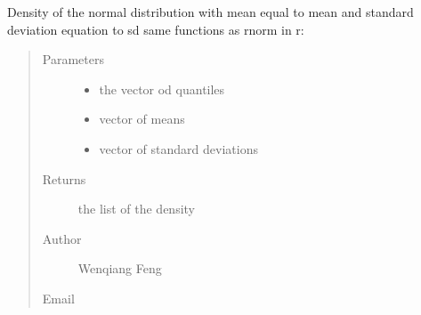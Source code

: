 \documentclass[letterpaper,12pt,english]{sphinxmanual}
\begin{document}
\begin{fulllineitems}
Density of the normal distribution with mean
equal to mean and standard deviation equation to sd
same functions as rnorm in r: 
\begin{quote}\begin{description}
\item[{Parameters}] \leavevmode\begin{itemize}
\item {} 
 \textendash{} the vector od quantiles

\item {} 
 \textendash{} vector of means

\item {} 
 \textendash{} vector of standard deviations

\end{itemize}

\item[{Returns}] \leavevmode
the list of the density

\item[{Author}] \leavevmode
Wenqiang Feng

\item[{Email}] \leavevmode
{}

\end{description}\end{quote}

\end{fulllineitems}



\section{}
\label{\detokenize{api:runif}}
\end{document}
